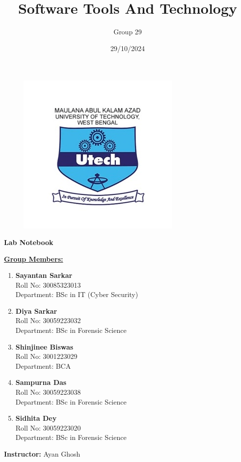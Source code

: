 \documentclass[12pt, a4paper]{article}
\title{\Huge \textbf{Software Tools And Technology}}
\author{Group 29}
\date{}
\begin{document}
\begin{figure}
    \centering
    \includegraphics[width=0.3\linewidth]{Makaut.png}
\end{figure}

\maketitle
{}


\begin{center}
    \vspace{-1.2cm}
    \LARGE\textbf{Lab Notebook}
\end{center}

\vspace{0.5cm}

\centering
\bfseries{\underline{Group Members:}}
\vspace{0.2cm}

\begin{enumerate}
    \item \textbf{Sayantan Sarkar} \\
    Roll No: 30085323013 \\
    Department: BSc in IT (Cyber Security)
    
    \item \textbf{Diya Sarkar} \\
    Roll No: 30059223032 \\
    Department: BSc in Forensic Science
    
    \item \textbf{Shinjinee Biswas} \\
    Roll No: 3001223029 \\
    Department: BCA
    
    \item \textbf{Sampurna Das} \\
    Roll No: 30059223038 \\
    Department: BSc in Forensic Science
    
    \item \textbf{Sidhita Dey} \\
    Roll No: 30059223020 \\
    Department: BSc in Forensic Science
\end{enumerate}

\vspace{0.8cm}
\textbf{Instructor:} Ayan Ghosh \\
\date{29/10/2024}
\end{document}
